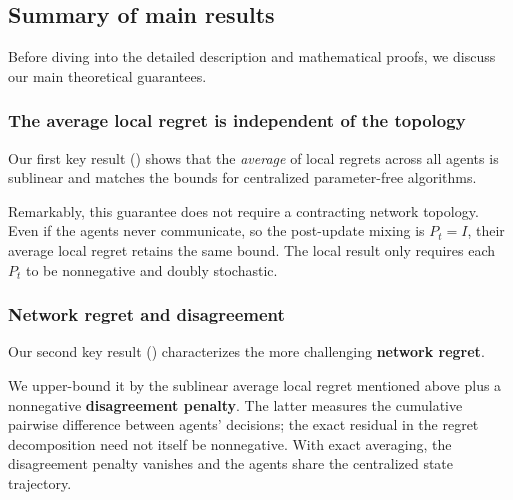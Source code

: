 \documentclass[journal]{IEEEtran}
\newcommand{\algname}{{DECO}\xspace}
\begin{document}
{
    \makeatletter
    \renewcommand\fs@ruled{%
        \def\@fs@cfont{\color{black}\bfseries}%
        \let\@fs@capt\floatc@ruled%
        \def\@fs@pre{\hbox{\textcolor{black}{\rule{\columnwidth}{.8pt}}}\kern2pt}%
        \def\@fs@mid{\kern2pt\hbox{\textcolor{black}{\rule{\columnwidth}{.4pt}}}\kern2pt}%
        \def\@fs@post{\kern2pt\hbox{\textcolor{black}{\rule{\columnwidth}{.4pt}}}\relax}%
        \let\@fs@iftopcapt\iftrue}
    \makeatother
    \begin{algorithm}[t]
        \caption{\textcolor{black}{Decentralized Coin-Betting (\algname{}), variants (\colorbox{red!30}{}) and (\colorbox{green!30}{})}}\label{alg:decentralized-coin-betting}
        
    \end{algorithm}
}

\subsection{Summary of main results}
Before diving into the detailed description and mathematical proofs, we discuss our main theoretical guarantees.
\subsubsection{The average local regret is independent of the topology}
Our first key result () shows that the \emph{average} of local regrets across all agents is sublinear and matches the bounds for centralized parameter-free algorithms.
    {\color{blue}
        Remarkably, this guarantee does not require a contracting network topology.
        Even if the agents never communicate, so the post-update mixing is $P_t=I$, their average local regret retains the same bound.
        The local result only requires each $P_t$ to be nonnegative and doubly stochastic.
        \par}

\subsubsection{Network regret and disagreement}
Our second key result () characterizes the more challenging \textbf{network regret}.
    {\color{blue}
        We upper-bound it by the sublinear average local regret mentioned above plus a nonnegative \textbf{disagreement penalty}.
        The latter measures the cumulative pairwise difference between agents' decisions; the exact residual in the regret decomposition need not itself be nonnegative.
        With exact averaging, the disagreement penalty vanishes and the agents share the centralized state trajectory.
        \par}
\end{document}
